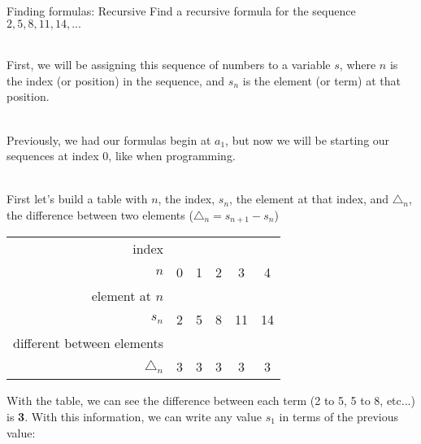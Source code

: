     \begin{intro}{Finding formulas: Recursive}
        Find a recursive formula for the sequence $2, 5, 8, 11, 14, ...$

        ~\\     First, we will be assigning this sequence of numbers to a variable $s$,
                where $n$ is the index (or position) in the sequence, and $s_{n}$ is
                the element (or term) at that position.

        ~\\     Previously, we had our formulas begin at $a_{1}$, but now we will
                be starting our sequences at index $0$, like when programming.

        ~\\     First let's build a table with $n$, the index, $s_{n}$, the element
                at that index, and $\triangle_{n}$, the difference between two elements
                ($\triangle_{n} = s_{n+1} - s_{n}$)

        \begin{center}
            \begin{tabular}{| r | c | c | c | c | c | }
                \hline
                \footnotesize   index & & & & & \\ 
                $n$
                & 0 & 1 & 2 & 3 & 4
                \\ \hline
                
                \footnotesize element at $n$ & & & & & \\
                $s_{n}$
                & 2 & 5 & 8 & 11 & 14
                \\ \hline
                
                \footnotesize different between elements & & & & & \\
                $\triangle_{n}$
                & 3 & 3 & 3 & 3 & 3
                \\ \hline
            \end{tabular}
        \end{center}

        With the table, we can see the difference between each term (2 to 5, 5 to 8, etc...) is \textbf{3}.
        With this information, we can write any value $s_{1}$ in terms of the previous value:
    

\end{intro}
